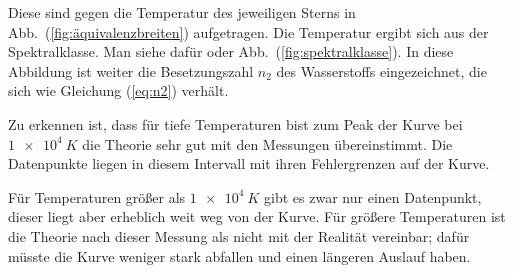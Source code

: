 Diese sind gegen die Temperatur des jeweiligen Sterns in Abb.\ (\ref{fig:äquivalenzbreiten}) aufgetragen.
Die Temperatur ergibt sich aus der Spektralklasse.
Man siehe dafür \cite{anleitung464} oder Abb.\ (\ref{fig:spektralklasse}).
In diese Abbildung ist weiter die Besetzungszahl $n_2$ des Wasserstoffs eingezeichnet, die sich wie Gleichung (\ref{eq:n2}) verhält.

Zu erkennen ist, dass für tiefe Temperaturen bist zum Peak der Kurve bei $\SI{1e+4}{K}$ die Theorie sehr gut mit den Messungen übereinstimmt.
Die Datenpunkte liegen in diesem Intervall mit ihren Fehlergrenzen auf der Kurve.

Für Temperaturen größer als $\SI{1e+4}{K}$ gibt es zwar nur einen Datenpunkt, dieser liegt aber erheblich weit weg von der Kurve.
Für größere Temperaturen ist die Theorie nach dieser Messung als nicht mit der Realität vereinbar; dafür müsste die Kurve weniger stark abfallen und einen längeren Auslauf haben. %
